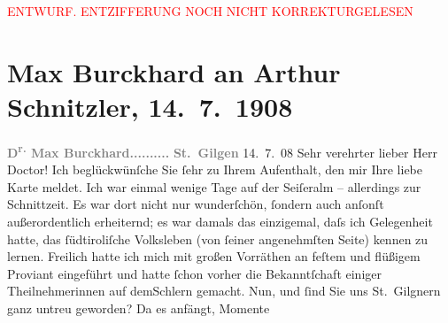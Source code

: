 
\begin{center}
            \textcolor{red}{ENTWURF. ENTZIFFERUNG NOCH NICHT KORREKTURGELESEN}
                      \end{center}
            
               \section[Max Burckhard an Arthur Schnitzler, 14. 7. 1908]{ Max Burckhard an Arthur Schnitzler, 14. 7. 1908}\nopagebreak{}\rehead{ }\begin{ledgroupsized}[t]{13cm}\normalsize\beginnumbering{} \toendnotes[C]{\smallbreak\pagebreak[2]} 
\toendnotes[C]{\smallbreak}\pstart
           \noindent{}{\pb}\textcolor{gray}{\textbf{D\textsuperscript{r.} Max Burckhard}}\hfill \textcolor{gray}{\textbf{..........}}\pend
           \pstart
           \raggedleft{}\textcolor{gray}{\textbf{St. Gilgen}}{ }14. 7. 08\pend
           \pstart{}Sehr verehrter lieber Herr Doctor!\pend\pstart
           Ich beglückwünſche Sie ſehr  zu Ihrem
                    Aufenthalt, den mir Ihre liebe Karte meldet. Ich war einmal wenige Tage auf der
                        Seiſeralm – allerdings zur Schnittzeit. Es
                    war dort nicht nur wunderſchön, ſondern auch anſonſt außerordentlich erheiternd;
                    es war damals das einzigemal, daſs ich Gelegenheit hatte, das ſüdtiroliſche Volksleben (von ſeiner angenehmſten Seite)
                    kennen zu lernen. Freilich hatte ich mich mit großen Vorräthen an feſtem und
                    flüßigem Proviant eingeführt und hatte ſchon vorher die Bekanntſchaft einiger
                    Theilnehmerinnen auf demSchlern gemacht.\pend
           \pstart
           {\pb}Nun, und ſind Sie uns St. Gilgnern ganz untreu geworden? Da es anfängt, Momente

\end{ledgroupsized}

